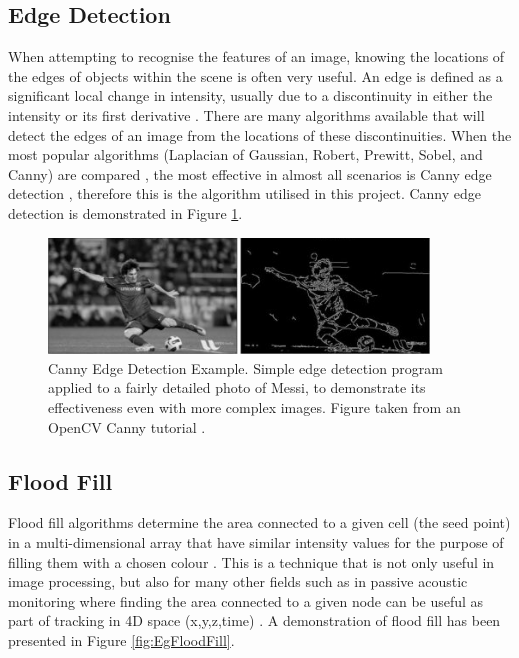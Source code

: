 \subsection{Edge Detection}
When attempting to recognise the features of an image, knowing the locations of the edges of objects within the scene is often very useful. An edge is defined as a significant local change in intensity, usually due to a discontinuity in either the intensity or its first derivative \cite{jain1995machine}. There are many algorithms available that will detect the edges of an image from the locations of these discontinuities. When the most popular algorithms (Laplacian of Gaussian, Robert, Prewitt, Sobel, and Canny) are compared \cite{maini2009study}, the most effective in almost all scenarios is Canny edge detection \cite{canny1986computational}, therefore this is the algorithm utilised in this project. Canny edge detection is demonstrated in Figure \ref{fig:canny1}.

\begin{figure}[H]
    \begin{center}
      \includegraphics[width=0.9\textwidth]{Figures/canny2.png}
      \caption[Canny Edge Detection Example]{Canny Edge Detection Example. Simple edge detection program applied to a fairly detailed photo of Messi, to demonstrate its effectiveness even with more complex images. Figure taken from an OpenCV Canny tutorial \cite{Canny1Source}.}
      \label{fig:canny1}
    \end{center}
\end{figure}

\subsection{Flood Fill}

Flood fill algorithms determine the area connected to a given cell (the seed point) in a multi-dimensional array that have similar intensity values for the purpose of filling them with a chosen colour \cite{FloodFill}. This is a technique that is not only useful in image processing, but also for many other fields such as in passive acoustic monitoring where finding the area connected to a given node can be useful as part of tracking in 4D space (x,y,z,time) \cite{nosal2008flood}. A demonstration of flood fill has been presented in Figure \ref{fig:EgFloodFill}.

